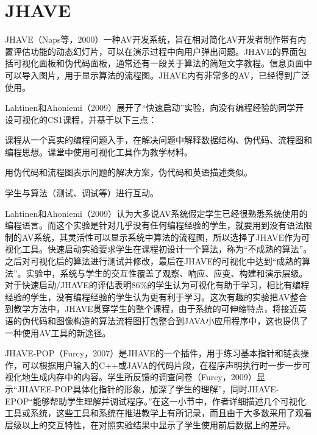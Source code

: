 \section{JHAVE}
\begin{sectext}
JHAVE（Naps等，2000）一种AV开发系统，旨在相对简化AV开发者制作带有内置评估功能的动态幻灯片，可以在演示过程中向用户弹出问题。JHAVE的界面包括可视化面板和伪代码面板，通常还有一段关于算法的简短文字教程。信息页面中可以导入图片，用于显示算法的流程图。JHAVE内有非常多的AV，已经得到广泛使用。

Lahtinen和Ahoniemi（2009）展开了``快速启动''实验，向没有编程经验的同学开设可视化的CS1课程，并基于以下三点：

\begin{itemlist}
\item 课程从一个真实的编程问题入手，在解决问题中解释数据结构、伪代码、流程图和编程思想。课堂中使用可视化工具作为教学材料。

\item 用伪代码和流程图表示问题的解决方案，伪代码和英语描述类似。

\item 学生与算法（测试、调试等）进行互动。
\end{itemlist}

Lahtinen和Ahoniemi（2009）认为大多说AV系统假定学生已经很熟悉系统使用的编程语言。而这个实验是针对几乎没有任何编程经验的学生，就要用到没有语法限制的AV系统，其灵活性可以显示系统中算法的流程图，所以选择了JHAVE作为可视化工具。快速启动实验要求学生在课程初设计一个算法，称为``不成熟的算法''。之后对可视化后的算法进行测试并修改，最后在JHAVE的可视化中达到``成熟的算法''。实验中，系统与学生的交互性覆盖了观察、响应、应变、构建和演示层级。对于快速启动/JHAVE的评估表明86\%的学生认为可视化有助于学习，相比有编程经验的学生，没有编程经验的学生认为更有利于学习。这次有趣的实验把AV整合到教学方法中，JHAVE贯穿学生的整个课程，由于系统的可伸缩特点，将接近英语的伪代码和图像构造的算法流程图打包整合到JAVA小应用程序中，这也提供了一种使用AV工具的新途径。

JHAVE-POP（Furcy，2007）是JHAVE的一个插件，用于练习基本指针和链表操作，可以根据用户输入的C++或JAVA的代码片段，在程序声明执行时一步一步可视化地生成内存中的内容。学生所反馈的调查问卷（Furcy，2009）显示``JHAVEE-POP具体化指针的形象，加深了学生的理解''，同时JHAVE-EPOP``能够帮助学生理解并调试程序。''在这一小节中，作者详细描述几个可视化工具或系统，这些工具和系统在推进教学上有所记录，而且由于大多数采用了观看层级以上的交互特性，在对照实验结果中显示了学生使用前后数据上的差异。
\end{sectext}
